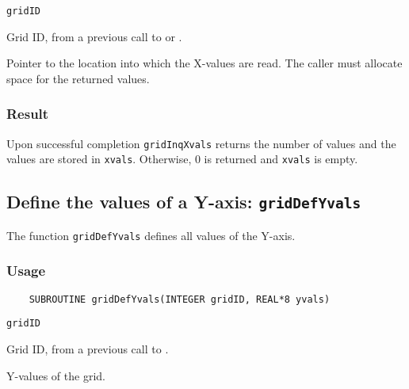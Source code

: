 \hspace*{4mm}\begin{minipage}[]{15cm}
\begin{deflist}{\tt gridID\ }
\item[{\tt gridID}]
Grid ID, from a previous call to {} or {}.
\item[{\tt xvals}]
Pointer to the location into which the X-values are read.
                    The caller must allocate space for the returned values.

\end{deflist}
\end{minipage}

\subsubsection*{Result}

Upon successful completion {\tt gridInqXvals} returns the number of values and
the values are stored in {\tt xvals}.
Otherwise, 0 is returned and {\tt xvals} is empty.



\subsection{Define the values of a Y-axis: {\tt gridDefYvals}}
\label{gridDefYvals}

The function {\tt gridDefYvals} defines all values of the Y-axis.

\subsubsection*{Usage}

\begin{verbatim}
    SUBROUTINE gridDefYvals(INTEGER gridID, REAL*8 yvals)
\end{verbatim}

\hspace*{4mm}\begin{minipage}[]{15cm}
\begin{deflist}{\tt gridID\ }
\item[{\tt gridID}]
Grid ID, from a previous call to {}.
\item[{\tt yvals}]
Y-values of the grid.

\end{deflist}
\end{minipage}


